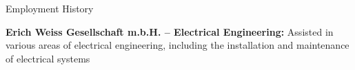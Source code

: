 \begin{rubric}{Employment History}

%
	\textbf{Erich Weiss Gesellschaft m.b.H. – Electrical Engineering: }
     Assisted in various areas of electrical engineering, including the installation and maintenance of electrical systems
        
%
\end{rubric}